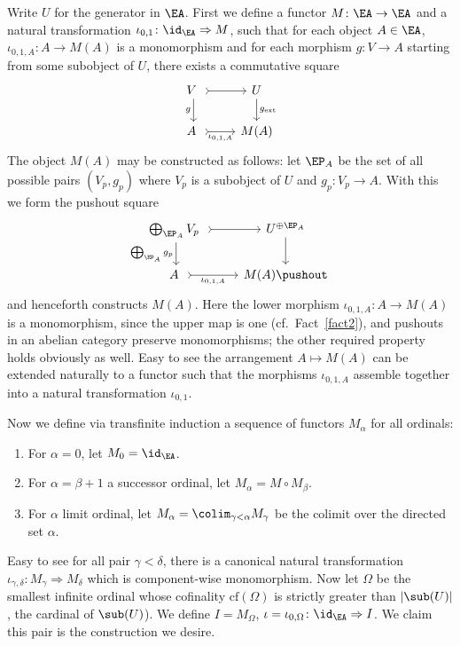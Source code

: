 \documentclass[twoside]{article}
\begin{document}
 Write $U$ for the generator in $\EA$.
First we define a functor $M\colon \EA \rightarrow \EA$ and a natural transformation $\iota_{0,1}\colon \id_\EA \Rightarrow M$, such that for each object $A \in \EA$, $\iota_{0, 1, A}\colon A \rightarrow M(A)$ is a monomorphism and for each morphism $g\colon V \rightarrow A$ starting from some subobject of $U$, there exists a commutative square
$$\begin{tikzcd}
    V \ \ar[r, tail] \ar[d, "g"']  & U \ar[d, "g_{\mathrm{ext}}"]\\
A \ \ar[r, tail, "\iota_{0, 1, A}"'] &M(A)
\end{tikzcd}$$
The object $M(A)$ may be constructed as follows: let $\EP_A$ be the set of all possible pairs $(V_p, g_p)$ where $V_p$ is a subobject of $U$ and $g_p\colon V_p \rightarrow A$. With this we form the pushout square
$$\begin{tikzcd}
    \bigoplus_{\EP_A} V_p \ \ar[r, tail] \ar[d, "\bigoplus_{\EP_A} g_p"']  & U^{\oplus \EP_A} \ar[d]\\
A \ \ar[r, tail, "\iota_{0, 1, A}"'] & M(A) \pushout
\end{tikzcd}$$
and henceforth constructs $M(A)$. Here the lower morphism $\iota_{0,1, A}\colon A \rightarrow M(A)$ is a monomorphism, since the upper map is one (cf.\ Fact~\ref{fact2}), and pushouts in an abelian category preserve monomorphisms; the other required property holds obviously as well. Easy to see the arrangement $A \mapsto M(A)$ can be extended naturally to a functor such that the morphisms $\iota_{0,1, A}$ assemble together into a natural transformation $\iota_{0,1}$.\vspace{\topsep}

Now we define via transfinite induction a sequence of functors $M_\alpha$ for all ordinals:
\begin{enumerate}
\item For $\alpha = 0$, let $M_0 = \id_\EA$.
\item For $\alpha = \beta + 1$ a successor ordinal, let $M_\alpha = M \circ M_\beta$.
\item For $\alpha$ limit ordinal, let $M_\alpha = \colim_{\gamma < \alpha} M_\gamma$ be the colimit over the directed set $\alpha$.
\end{enumerate}
Easy to see for all pair $\gamma < \delta$, there is a canonical natural transformation $\iota_{\gamma, \delta}\colon M_\gamma \Rightarrow M_\delta$ which is component-wise monomorphism. Now let $\Omega$ be the smallest infinite ordinal whose cofinality $\mathrm{cf}(\Omega)$ is strictly greater than $\left|  \sub(U) \right|$, the cardinal of $\sub(U)$). We define $I = M_\Omega$, $\iota = \iota_{0, \Omega}\colon \id_\EA \Rightarrow I$. We claim this pair is the construction we desire.\vspace{\topsep}
\end{document}
